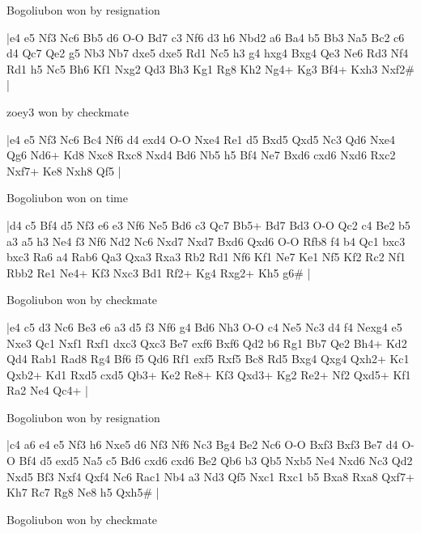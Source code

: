 \showboard

Bogoliubon won by resignation

\makegametitle
|e4 e5 Nf3 Nc6 Bb5 d6 O-O Bd7 c3 Nf6 d3 h6 Nbd2 a6 Ba4 b5 Bb3 Na5 Bc2 c6 d4 Qc7 Qe2 g5 Nb3 Nb7 dxe5 dxe5 Rd1 Nc5 h3 g4 hxg4 Bxg4 Qe3 Ne6 Rd3 Nf4 Rd1 h5 Nc5 Bh6 Kf1 Nxg2 Qd3 Bh3 Kg1 Rg8 Kh2 Ng4+ Kg3 Bf4+ Kxh3 Nxf2\#  |

\showboard

zoey3 won by checkmate

\makegametitle
|e4 e5 Nf3 Nc6 Bc4 Nf6 d4 exd4 O-O Nxe4 Re1 d5 Bxd5 Qxd5 Nc3 Qd6 Nxe4 Qg6 Nd6+ Kd8 Nxc8 Rxc8 Nxd4 Bd6 Nb5 h5 Bf4 Ne7 Bxd6 cxd6 Nxd6 Rxc2 Nxf7+ Ke8 Nxh8 Qf5  |

\showboard

Bogoliubon won on time

\makegametitle
|d4 c5 Bf4 d5 Nf3 e6 e3 Nf6 Ne5 Bd6 c3 Qc7 Bb5+ Bd7 Bd3 O-O Qc2 c4 Be2 b5 a3 a5 h3 Ne4 f3 Nf6 Nd2 Nc6 Nxd7 Nxd7 Bxd6 Qxd6 O-O Rfb8 f4 b4 Qc1 bxc3 bxc3 Ra6 a4 Rab6 Qa3 Qxa3 Rxa3 Rb2 Rd1 Nf6 Kf1 Ne7 Ke1 Nf5 Kf2 Rc2 Nf1 Rbb2 Re1 Ne4+ Kf3 Nxc3 Bd1 Rf2+ Kg4 Rxg2+ Kh5 g6\#  |

\showboard

Bogoliubon won by checkmate

\makegametitle
|e4 c5 d3 Nc6 Be3 e6 a3 d5 f3 Nf6 g4 Bd6 Nh3 O-O c4 Ne5 Nc3 d4 f4 Nexg4 e5 Nxe3 Qc1 Nxf1 Rxf1 dxc3 Qxc3 Be7 exf6 Bxf6 Qd2 b6 Rg1 Bb7 Qe2 Bh4+ Kd2 Qd4 Rab1 Rad8 Rg4 Bf6 f5 Qd6 Rf1 exf5 Rxf5 Bc8 Rd5 Bxg4 Qxg4 Qxh2+ Kc1 Qxb2+ Kd1 Rxd5 cxd5 Qb3+ Ke2 Re8+ Kf3 Qxd3+ Kg2 Re2+ Nf2 Qxd5+ Kf1 Ra2 Ne4 Qc4+  |

\showboard

Bogoliubon won by resignation

\makegametitle
|c4 a6 e4 e5 Nf3 h6 Nxe5 d6 Nf3 Nf6 Nc3 Bg4 Be2 Nc6 O-O Bxf3 Bxf3 Be7 d4 O-O Bf4 d5 exd5 Na5 c5 Bd6 cxd6 cxd6 Be2 Qb6 b3 Qb5 Nxb5 Ne4 Nxd6 Nc3 Qd2 Nxd5 Bf3 Nxf4 Qxf4 Nc6 Rac1 Nb4 a3 Nd3 Qf5 Nxc1 Rxc1 b5 Bxa8 Rxa8 Qxf7+ Kh7 Rc7 Rg8 Ne8 h5 Qxh5\#  |

\showboard

Bogoliubon won by checkmate

